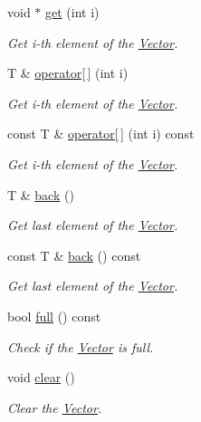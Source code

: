 \begin{DoxyCompactItemize}
\item 
void $\ast$ \hyperlink{class_magnum_1_1_vector_a1e7f4e2774e1d3c4bbafdee1272acb79}{get} (int i)
\begin{DoxyCompactList}\small\item\em Get i-\/th element of the \hyperlink{class_magnum_1_1_vector}{Vector}. \end{DoxyCompactList}\item 
T \& \hyperlink{class_magnum_1_1_vector_a0130a7137209ce2e30dbc52d9c2a938a}{operator\mbox{[}$\,$\mbox{]}} (int i)
\begin{DoxyCompactList}\small\item\em Get i-\/th element of the \hyperlink{class_magnum_1_1_vector}{Vector}. \end{DoxyCompactList}\item 
const T \& \hyperlink{class_magnum_1_1_vector_acdc74b0e4facc66319461c7c079f455f}{operator\mbox{[}$\,$\mbox{]}} (int i) const 
\begin{DoxyCompactList}\small\item\em Get i-\/th element of the \hyperlink{class_magnum_1_1_vector}{Vector}. \end{DoxyCompactList}\item 
T \& \hyperlink{class_magnum_1_1_vector_a630a21421716742f8d64622dc6e198f2}{back} ()
\begin{DoxyCompactList}\small\item\em Get last element of the \hyperlink{class_magnum_1_1_vector}{Vector}. \end{DoxyCompactList}\item 
const T \& \hyperlink{class_magnum_1_1_vector_a5ce75a14c5af280e4abdc028e4d39bcb}{back} () const 
\begin{DoxyCompactList}\small\item\em Get last element of the \hyperlink{class_magnum_1_1_vector}{Vector}. \end{DoxyCompactList}\item 
bool \hyperlink{class_magnum_1_1_vector_a64ca8bd8cfa9fcc6150b40eadad4ac88}{full} () const 
\begin{DoxyCompactList}\small\item\em Check if the \hyperlink{class_magnum_1_1_vector}{Vector} is full. \end{DoxyCompactList}\item 
void \hyperlink{class_magnum_1_1_vector_af2b60f8a75083db19544c9036701c57d}{clear} ()
\begin{DoxyCompactList}\small\item\em Clear the \hyperlink{class_magnum_1_1_vector}{Vector}. \end{DoxyCompactList}\item 

\end{DoxyCompactItemize}
